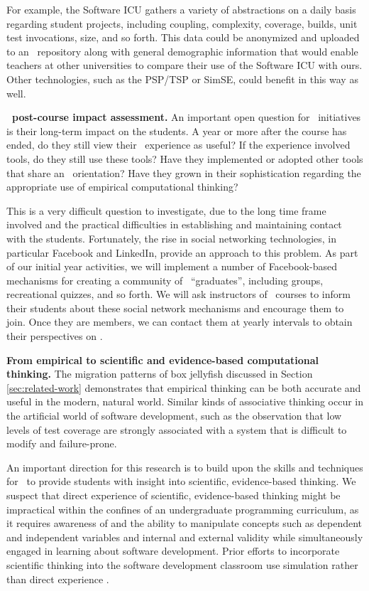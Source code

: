 For example, the Software ICU gathers a variety of abstractions on a daily
basis regarding student projects, including coupling, complexity, coverage,
builds, unit test invocations, size, and so forth.  This data could be
anonymized and uploaded to an \eCT\ repository along with general
demographic information that would enable teachers at other universities to
compare their use of the Software ICU with ours.  Other technologies, such
as the PSP/TSP or SimSE, could benefit in this way as well.

{\bf \eCT\ post-course impact assessment.}  An important open question for
\eCT\ initiatives is their long-term impact on the students.  A year or more after
the course has ended, do they still view their \eCT\ experience as useful?
If the experience involved tools, do they still use these tools?  Have they
implemented or adopted other tools that share an \eCT\ orientation?  Have
they grown in their sophistication regarding the appropriate use of
empirical computational thinking?

This is a very difficult question to investigate, due to the long time
frame involved and the practical difficulties in establishing and
maintaining contact with the students.  Fortunately, the rise in social
networking technologies, in particular Facebook and LinkedIn, provide an
approach to this problem.  As part of our initial year activities, we will
implement a number of Facebook-based mechanisms for creating a community of
\eCT\ ``graduates'', including groups, recreational quizzes, and so forth.
We will ask instructors of \eCT\ courses to inform their students
about these social network mechanisms and encourage them to join.  Once
they are members, we can contact them at yearly intervals
to obtain their perspectives on \eCT.

{\bf From empirical to scientific and evidence-based computational
thinking.}  The migration patterns of box jellyfish discussed in Section
\ref{sec:related-work} demonstrates that empirical thinking can be both
accurate and useful in the modern, natural world. Similar kinds of
associative thinking occur in the artificial world of software development,
such as the observation that low levels of test coverage are strongly
associated with a system that is difficult to modify and 
failure-prone.

An important direction for this research is to build upon the skills and
techniques for \eCT\ to provide students with insight into scientific,
evidence-based thinking.  We suspect that direct experience of scientific,
evidence-based thinking might be impractical within the confines of an
undergraduate programming curriculum, as it requires awareness of and the
ability to manipulate concepts such as dependent and independent variables
and internal and external validity while simultaneously engaged in learning
about software development. Prior efforts to incorporate scientific
thinking into the software development classroom use simulation rather than
direct experience \citep{Host02}.

